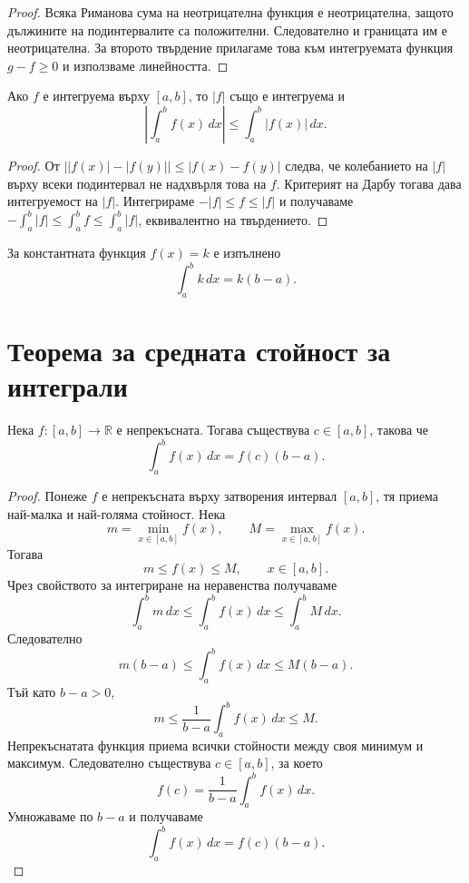 \begin{proof}
Всяка Риманова сума на неотрицателна функция е неотрицателна, защото дължините на подинтервалите са положителни. Следователно и границата им е неотрицателна. За второто твърдение прилагаме това към интегруемата функция $g-f\ge0$ и използваме линейността.
\end{proof}

\begin{cor}
Ако $f$ е интегруема върху $[a,b]$, то $|f|$ също е интегруема и
\[
\left|\int_a^b f(x)\,dx\right|
\leq
\int_a^b |f(x)|\,dx.
\]
\end{cor}

\begin{proof}
От $\bigl||f(x)|-|f(y)|\bigr|\le|f(x)-f(y)|$ следва, че колебанието на $|f|$ върху всеки подинтервал не надхвърля това на $f$. Критерият на Дарбу тогава дава интегруемост на $|f|$. Интегрираме $-|f|\le f\le|f|$ и получаваме $-\int_a^b|f|\le\int_a^b f\le\int_a^b|f|$, еквивалентно на твърдението.
\end{proof}

\begin{example}
За константната функция $f(x)=k$ е изпълнено
\[
\int_a^b k\,dx=k(b-a).
\]
\end{example}

\section{Теорема за средната стойност за интеграли}\label{s:33.5}

\begin{thm}
\label{thm:meanintegral}
Нека $f\colon[a,b]\to\mathbb{R}$ е непрекъсната. Тогава съществува $c\in[a,b]$, такова че
\[
\int_a^b f(x)\,dx=f(c)(b-a).
\]
\end{thm}

\begin{proof}
Понеже $f$ е непрекъсната върху затворения интервал $[a,b]$, тя приема най-малка и най-голяма стойност. Нека
\[
m=\min_{x\in[a,b]}f(x),
\qquad
M=\max_{x\in[a,b]}f(x).
\]
Тогава
\[
m\leq f(x)\leq M,
\qquad x\in[a,b].
\]
Чрез свойството за интегриране на неравенства получаваме
\[
\int_a^b m\,dx
\leq
\int_a^b f(x)\,dx
\leq
\int_a^b M\,dx.
\]
Следователно
\[
m(b-a)
\leq
\int_a^b f(x)\,dx
\leq
M(b-a).
\]
Тъй като $b-a>0$,
\[
m\leq
\frac{1}{b-a}\int_a^b f(x)\,dx
\leq M.
\]
Непрекъснатата функция приема всички стойности между своя минимум и максимум. Следователно съществува $c\in[a,b]$, за което
\[
f(c)=\frac{1}{b-a}\int_a^b f(x)\,dx.
\]
Умножаваме по $b-a$ и получаваме
\[
\int_a^b f(x)\,dx=f(c)(b-a).
\]
\end{proof}

